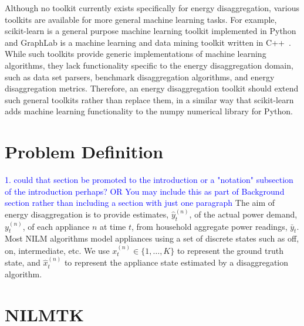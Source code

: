 \documentclass{sig-alternate}
\newcommand{\bluecolor}[1]{\textcolor{blue}{#1}}
\begin{document}
Although no toolkit currently exists specifically for energy disaggregation, various toolkits are available for more general machine learning tasks. For example, scikit-learn is a general purpose machine learning toolkit implemented in Python~\cite{scikit-learn} and GraphLab is a machine learning and data mining toolkit written in C++~\cite{graphlab}. While such toolkits provide generic implementations of machine learning algorithms, they lack functionality specific to the energy disaggregation domain, such as data set parsers, benchmark disaggregation algorithms, and energy disaggregation metrics. Therefore, an energy disaggregation toolkit should extend such general toolkits rather than replace them, in a similar way that scikit-learn adds machine learning functionality to the numpy numerical library for Python. 

\section{Problem Definition}
\label{sec:problem}
\bluecolor{1. could that section be promoted to the introduction or a "notation" subsection of the introduction perhaps?
OR You may include this as part of Background section rather than including a section with just one paragraph}
\noindent 
The aim of energy disaggregation is to provide estimates, $\hat{y}^{(n)}_t$, of the actual power demand, $y^{(n)}_t$, of each appliance $n$ at time $t$, from household aggregate power readings, $\bar{y}_t$. Most NILM algorithms model appliances using a set of discrete states such as off, on, intermediate, etc.  We use $x^{(n)}_t \in \{1, \dots, K\}$ to represent the ground truth state, and $\hat{x}^{(n)}_t$ to represent the appliance state estimated by a disaggregation algorithm.

\section{NILMTK}
\label{sec:nilmtk}
\end{document}

